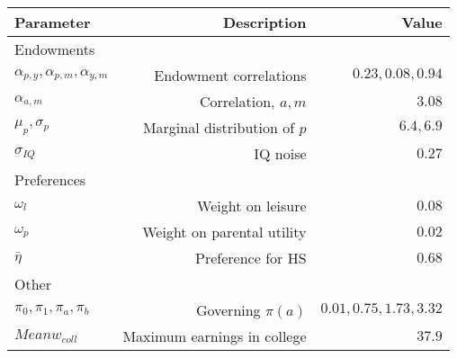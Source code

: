 \begin{tabular}{lrr}
\hline
Parameter & Description  & Value  \\
\hline
Endowments &   &   \\
$\alpha_{p,y}, \alpha_{p,m}, \alpha_{y,m}$ & Endowment correlations  & $0.23, 0.08, 0.94$  \\
$\alpha_{a,m}$ & Correlation, $a,m$  & $3.08$  \\
$\mu_{p}, \sigma_{p}$ & Marginal distribution of $p$  & $6.4, 6.9$  \\
$\sigma_{IQ}$ & IQ noise  & $0.27$  \\
Preferences &   &   \\
$\omega_{l}$ & Weight on leisure  & $0.08$  \\
$\omega_{p}$ & Weight on parental utility  & $0.02$  \\
$\bar{\eta}$ & Preference for HS  & $0.68$  \\
Other &   &   \\
$\pi_{0}, \pi_{1}, \pi_{a}, \pi_{b}$ & Governing $\pi(a)$  & $0.01, 0.75, 1.73, 3.32$  \\
$Mean w_{coll}$ & Maximum earnings in college  & $37.9$  \\
\hline
\end{tabular}%
